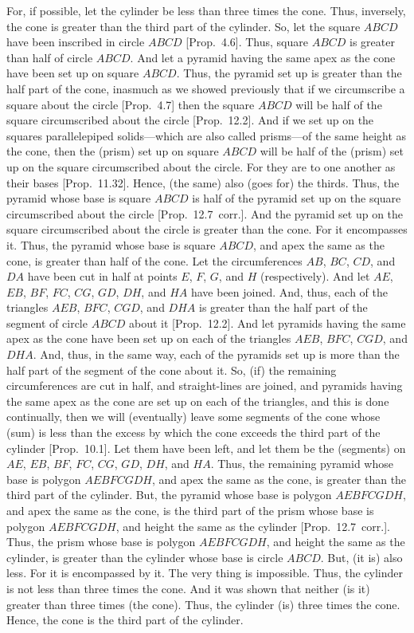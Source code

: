 For, if possible, let the cylinder be less than three times the cone. Thus, inversely, the cone is greater than the third
part of the cylinder. So, let the square $ABCD$ have been inscribed in circle $ABCD$  [Prop.~4.6]. Thus, square $ABCD$ is greater
than half of circle $ABCD$. 
And let a pyramid having the same apex as the cone have been set up on square  $ABCD$. Thus, the pyramid set up
is greater than the half part of the cone, inasmuch as we showed previously that if we circumscribe a square
about the circle [Prop.~4.7] then the square $ABCD$ will be half of the square circumscribed about the circle [Prop.~12.2]. And if we set up   on the squares parallelepiped solids---which are also
called prisms---of the same height as the cone, then the (prism) set up on square $ABCD$ will be half of the (prism) set up on the square circumscribed
about the circle. For they are to one another as their bases [Prop.~11.32]. Hence, (the same) also (goes for) the thirds.  Thus, the pyramid whose base is square $ABCD$ is half of the pyramid set up on the square
circumscribed about the circle [Prop.~12.7~corr.]. And the pyramid set up on the square
circumscribed about the circle is greater than the cone. For it encompasses it. Thus, the pyramid whose
base is square $ABCD$, and apex the same as the cone, is greater than half of the cone. Let the circumferences $AB$,
$BC$, $CD$, and $DA$ have been cut in half at points $E$, $F$, $G$, and $H$ (respectively).  And let $AE$, $EB$, $BF$,
$FC$, $CG$, $GD$, $DH$, and $HA$ have been joined. And, thus, each of the triangles $AEB$, $BFC$,
$CGD$, and $DHA$ is greater than the half part of the segment of circle $ABCD$ about it [Prop.~12.2].
And let pyramids having the same apex as the cone have been set up on each of the triangles $AEB$,
$BFC$, $CGD$, and $DHA$. And, thus, in the same way, each of the pyramids set up is more than the  half part of
the segment of the cone about it. So, (if) the remaining circumferences are cut in half, and straight-lines
are joined, and pyramids having the same apex as the cone are set up on each of the triangles, and this is
done continually, then we will (eventually) leave some segments of the cone 
whose (sum) is less than
the excess by which the cone exceeds the third part of the cylinder [Prop.~10.1]. 
Let them have been left, and let them be the (segments) on $AE$, $EB$, $BF$, $FC$, $CG$, $GD$,
$DH$, and $HA$. Thus, the remaining pyramid whose base is polygon $AEBFCGDH$, and apex the
same as the cone, is greater than the third part of the cylinder. But, the pyramid whose base is
polygon $AEBFCGDH$, and apex the same as the cone, is the third part of the prism whose base
is polygon $AEBFCGDH$, and height the same as the cylinder [Prop.~12.7~corr.].
Thus, the prism whose base is polygon $AEBFCGDH$, and height the same as the cylinder, is greater than
the cylinder whose base is circle $ABCD$. But, (it is) also less. For it is encompassed by it. The very thing
is impossible. Thus, the cylinder is not less than three times the cone. And it was shown that neither (is it)
greater than three times (the cone). Thus, the cylinder (is) three times the cone. Hence, the cone is the
third part of the cylinder.

